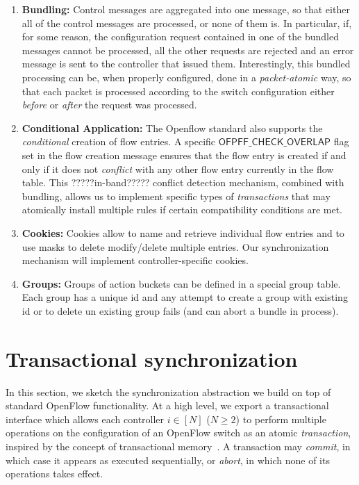\documentclass[conference]{sigcomm-alternate}
\begin{document}
\begin{enumerate}
\item \textbf{Bundling:}
Control messages are aggregated into one message, so that either all of the control messages are
processed, or none of them is. In particular, if, for some reason, the
configuration request contained in one of the bundled messages cannot
be processed, all the other requests  are rejected and an error
message is sent to the controller that issued them.
Interestingly, this bundled processing can be, when properly configured, done in a
\emph{packet-atomic} way, so that each packet is processed according
to the switch configuration either \emph{before} or \emph{after} the
request was processed.

\item \textbf{Conditional Application:}
The Openflow standard also supports the \emph{conditional} creation of
flow entries. A specific $\textsf{OFPFF\_CHECK\_OVERLAP}$ flag
set in the flow creation message ensures
that the flow entry is created if and only if it does not \emph{conflict}
with any other flow entry currently in the flow table.
This ?????in-band????? conflict detection mechanism, combined with bundling,
allows us to implement specific types of \emph{transactions} that may
atomically install multiple rules if certain compatibility conditions
are met.

\item \textbf{Cookies:} Cookies allow to name and retrieve individual
flow entries and to use masks to delete modify/delete multiple entries. Our synchronization mechanism will implement controller-specific cookies.

\item \textbf{Groups:} Groups of action buckets can be defined in a special group table. Each group has a unique id and any attempt to create a group with existing id or to delete un existing group fails (and can abort a bundle in process).
\end{enumerate}

\section{Transactional synchronization}\label{sec:trans}

In this section, we sketch the synchronization abstraction we build on
top of standard OpenFlow functionality. At a high level, we export a
transactional interface which allows each controller $i\in[N]$ ($N\geq
2$) to perform multiple
operations on the configuration of an OpenFlow switch as an atomic
\emph{transaction}, inspired by the concept of transactional
memory~\cite{stm-st95,tm-book}. A transaction may \emph{commit}, in
which case it appears as executed sequentially, or \emph{abort}, in
which none of its operations takes effect.  
\end{document}
